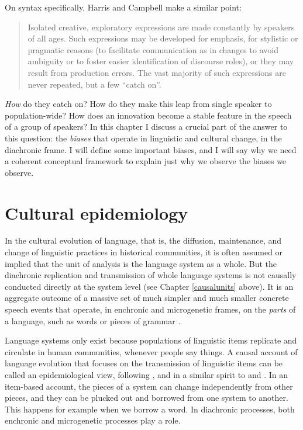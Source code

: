 	On syntax specifically, Harris and Campbell make a similar point:

\begin{quotation}
	Isolated creative, exploratory expressions are made constantly by speakers of all ages. Such expressions may be developed for emphasis, for stylistic or pragmatic reasons (to facilitate communication as in changes to avoid ambiguity or to foster easier identification of discourse roles), or they may result from production errors. The vast majority of such expressions are never repeated, but a few ``catch on''. \citep[54]{harris_historical_1995}
\end{quotation}

\textit{How} do they catch on? How do they make this leap from single speaker to population-wide? How does an innovation become a stable feature in the speech of a group of speakers? In this chapter I discuss a crucial part of the answer to this question: the \textit{biases} that operate in linguistic and cultural change, in the diachronic frame. I will define some important biases, and I will say why we need a coherent conceptual framework to explain just why we observe the biases we observe. 


\section{Cultural epidemiology}

In the cultural evolution of language, that is, the diffusion, 
maintenance, and change of linguistic practices in historical 
communities, it is often assumed or implied that the unit of analysis is 
the language system as a whole. But the diachronic replication and transmission of 
whole language systems is not causally conducted directly at the system level (see Chapter \ref{causalunits} above). It 
is an aggregate outcome of a massive set of much simpler and much 
smaller concrete speech events that operate, in enchronic and microgenetic frames, on the \textit{parts} of a language, such as words or pieces of grammar 
\citep{hudson_sociolinguistics_1996}. 



Language systems only exist because populations of linguistic items 
replicate and circulate in human communities, whenever people say things. A causal account of language evolution that focuses on the transmission of linguistic items can be called an 
epidemiological view, following \citet{sperber_anthropology_1985,sperber_explaining_1996}, 
and in a similar spirit to \citet{keller_language_1994} and \citet{croft_explaining_2000}. In an 
item-based account, the pieces of a system 
can change independently from other pieces, and they can be plucked out 
and borrowed from one system to another. This happens for example when we borrow a 
word. In diachronic processes, both enchronic and microgenetic processes play a role.



